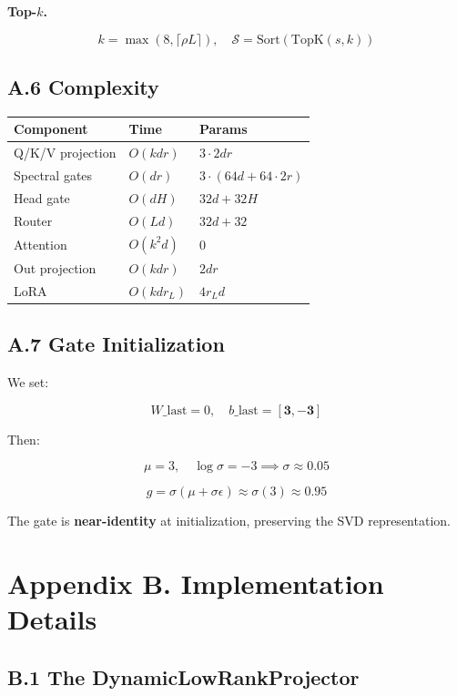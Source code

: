 \textbf{Top-$k$.}

\[
k = \max(8, \lceil \rho L \rceil), \quad
\mathcal{S} = \text{Sort}(\text{TopK}(s, k))
\tag{A.10}
\]

\subsection{A.6 Complexity}

\begin{table}[H]
\centering
\small
\begin{tabular}{lll}
\toprule
\textbf{Component} & \textbf{Time} & \textbf{Params} \\
\midrule
Q/K/V projection & $O(k d r)$ & $3 \cdot 2 d r$ \\
Spectral gates & $O(d r)$ & $3 \cdot (64d + 64 \cdot 2r)$ \\
Head gate & $O(d H)$ & $32d + 32H$ \\
Router & $O(L d)$ & $32d + 32$ \\
Attention & $O(k^2 d)$ & 0 \\
Out projection & $O(k d r)$ & $2 d r$ \\
LoRA & $O(k d r_L)$ & $4 r_L d$ \\
\bottomrule
\end{tabular}
\end{table}

\subsection{A.7 Gate Initialization}

We set:

\[
W\_\text{last} = 0, \quad b\_\text{last} = [\mathbf{3}, \mathbf{-3}]
\tag{A.11}
\]

Then:

\[
\mu = 3, \quad \log \sigma = -3 \implies \sigma \approx 0.05
\tag{A.12}
\]

\[
g = \sigma(\mu + \sigma \epsilon) \approx \sigma(3) \approx 0.95
\tag{A.13}
\]

The gate is \textbf{near-identity} at initialization, preserving the SVD 
representation.



\section{Appendix B. Implementation Details}

\subsection{B.1 The DynamicLowRankProjector}

